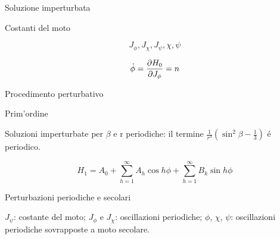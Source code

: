 \begin{wordonframe}{Soluzione imperturbata}

\begin{block}{Costanti del moto}

\begin{equation*}
J_{\phi}, J_{\chi}, J_{\psi}, \chi, \psi
\end{equation*}


\end{block}

\begin{equation*}
\dot{\phi}=\PDy{J_{\phi}}{H_0}=n
\end{equation*}



\end{wordonframe}



\begin{frame}{Procedimento perturbativo}


\begin{block}{Prim'ordine}

Soluzioni imperturbate per $\beta$ e r periodiche: il termine $\frac{1}{r^3}(\sin^2{\beta}-\frac{1}{3})$ \'e periodico.

\begin{equation*}
H_1=A_0+\sum_{h=1}^{\infty}A_h\cos{h\phi}+\sum_{h=1}^{\infty}B_k\sin{h\phi}
\end{equation*}


\end{block}

\begin{block}{Perturbazioni periodiche e secolari}

$J_{\psi}$: costante del moto; $J_{\phi}$ e $J_{\chi}$: oscillazioni periodiche; $\phi$, $\chi$, $\psi$: oscillazioni periodiche sovrapposte a moto secolare.

\end{block}



\end{frame}

